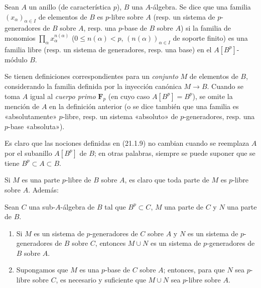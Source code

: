 \begin{definition}[21.1.9]
\label{0.21.1.9-fr}
Sean $A$ un anillo (de característica $p$), $B$ una $A$-álgebra. Se dice
que una familia $(x_\alpha)_{\alpha\in I}$ de elementos de $B$ es
$p$-libre sobre $A$ (\textup{resp.} un sistema de $p$-generadores de $B$ sobre $A$,
\textup{resp.} una $p$-base de $B$ sobre $A$) si la familia de monomios
$\prod_\alpha x_\alpha^{n(\alpha)}$ ($0\leq n(\alpha)<p$,
$(n(\alpha))_{\alpha\in I}$ de soporte finito) es una familia libre (\textup{resp.}
un sistema de generadores, \textup{resp.} una base) en el $A[B^p]$-módulo $B$.
\end{definition}

Se tienen definiciones correspondientes para un \emph{conjunto} $M$ de elementos de
$B$, considerando la familia definida por la inyección canónica $M\to B$.
Cuando se toma $A$ igual al \emph{cuerpo primo} $\mathbf F_p$ (en cuyo caso
$A[B^p]=B^p$), se omite la mención de $A$ en la definición anterior (o se
dice también que una familia es «absolutamente» $p$-libre, resp. un sistema
«absoluto» de $p$-generadores, resp. una $p$-base «absoluta»).

Es claro que las nociones definidas en (21.1.9) no cambian cuando se
reemplaza $A$ por el subanillo $A[B^p]$ de $B$; en otras palabras, siempre se puede
suponer que se tiene $B^p\subset A\subset B$.

Si $M$ es una parte $p$-libre de $B$ sobre $A$, es claro que toda parte
de $M$ es $p$-libre sobre $A$. Además:

\begin{lemma}[21.1.10]
\label{0.21.1.10-fr}
Sean $C$ una sub-$A$-álgebra de $B$ tal que $B^p\subset C$, $M$ una
parte de $C$ y $N$ una parte de $B$.
\begin{enumerate}
  \item[\textup{(i)}] Si $M$ es un sistema de $p$-generadores de $C$ sobre $A$ y $N$
  es un sistema de $p$-generadores de $B$ sobre $C$, entonces $M\cup N$ es un
  sistema de $p$-generadores de $B$ sobre $A$.
  \item[\textup{(ii)}] Supongamos que $M$ es una $p$-base de $C$ sobre $A$; entonces,
  para que $N$ sea $p$-libre sobre $C$, es necesario y suficiente que $M\cup N$
  sea $p$-libre sobre $A$.
\end{enumerate}
\end{lemma}

